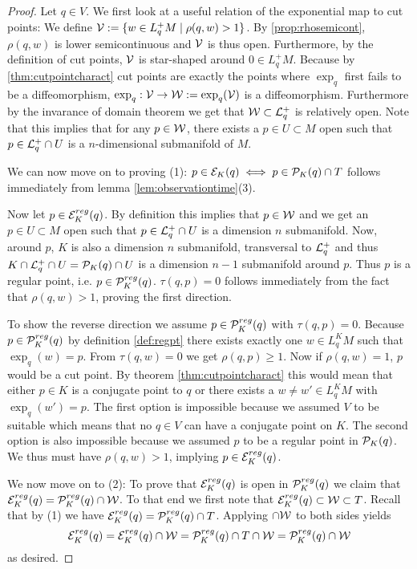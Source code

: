 \begin{proof}
Let $q\in V$. We first look at a useful relation of the exponential map to cut points: We define ${\mathcal{V}}:=\{w\in L^+_qM \mid \rho(q,w)>1\}$. By \ref{prop:rhosemicont}, $\rho(q,w)$ is lower semicontinuous and ${\mathcal{V}}$ is thus open. Furthermore, by the definition of cut points, ${\mathcal{V}}$ is star-shaped around $0\in L^+_qM$. Because by \ref{thm:cutpointcharact} cut points are exactly the points where $\exp_q$ first fails to be a diffeomorphism, $\exp_q:{\mathcal{V}}\to {\mathcal{W}}:=\exp_q({\mathcal{V}})$ is a diffeomorphism. Furthermore by the invarance of domain theorem we get that ${\mathcal{W}}\subset {\mathcal{L}}^+_q$ is relatively open. Note that this implies that for any $p\in {\mathcal{W}}$, there exists a $p\in U\subset M$ open such that $p\in{\mathcal{L}}^+_q\cap U$ is a $n$-dimensional submanifold of $M$.

We can now move on to proving (1): $p\in {\mathcal{E}}_K(q) \iff p\in {\mathcal{P}}_K(q) \cap T$ follows immediately from lemma \ref{lem:observationtime}(3).

Now let $p\in{\mathcal{E}}^{reg}_K(q)$. By definition this implies that $p\in {\mathcal{W}}$ and we get an $p\in U\subset M$ open such that $p\in{\mathcal{L}}^+_q\cap U$ is a dimension $n$ submanifold. Now, around $p$, $K$ is also a dimension $n$ submanifold, transversal to ${\mathcal{L}}^+_q$ and thus $K \cap {\mathcal{L}}^+_q \cap U = {{\mathcal{P}}_K(q)} \cap U$ is a dimension $n-1$ submanifold around $p$. Thus $p$ is a regular point, i.e. $p\in {\mathcal{P}}^{reg}_K(q)$. $\tau(q,p)=0$ follows immediately from the fact that $\rho(q,w)>1$, proving the first direction.

To show the reverse direction we assume $p\in {\mathcal{P}}^{reg}_K(q)$ with $\tau(q,p)=0$.
Because $p\in {\mathcal{P}}^{reg}_K(q)$ by definition \ref{def:regpt} there exists exactly one $w\in L^K_qM$ such that $\exp_q(w)=p$. From $\tau(q,w)=0$ we get $\rho(q,p)\ge 1$. Now if $\rho(q,w)=1$, $p$ would be a cut point. By theorem \ref{thm:cutpointcharact} this would mean that either $p\in K$ is a conjugate point to $q$ or there exists a $w\neq w'\in L^K_qM$ with $\exp_q(w')=p$. The first option is impossible because we assumed $V$ to be suitable which means that no $q\in V$ can have a conjugate point on $K$. The second option is also impossible because we assumed $p$ to be a regular point in ${\mathcal{P}}_K(q)$. We thus must have $\rho(q,w)>1$, implying $p\in {\mathcal{E}}^{reg}_K(q)$.

We now move on to (2): To prove that ${\mathcal{E}}^{reg}_K(q)$ is open in ${\mathcal{P}}^{reg}_K(q)$ we claim that ${\mathcal{E}}^{reg}_K(q)={\mathcal{P}}^{reg}_K(q)\cap {\mathcal{W}}$. To that end we first note that ${\mathcal{E}}_K^{reg}(q)\subset {\mathcal{W}} \subset T$. Recall that by (1) we have ${\mathcal{E}}_K^{reg}(q) = {\mathcal{P}}_K^{reg}(q) \cap T$. Applying $\cap {\mathcal{W}}$ to both sides yields
\[
    {\mathcal{E}}_K^{reg}(q) = {\mathcal{E}}_K^{reg}(q) \cap {\mathcal{W}} = {\mathcal{P}}_K^{reg}(q) \cap T \cap {\mathcal{W}} = {\mathcal{P}}_K^{reg}(q) \cap {\mathcal{W}}
\] as desired.


\end{proof}
